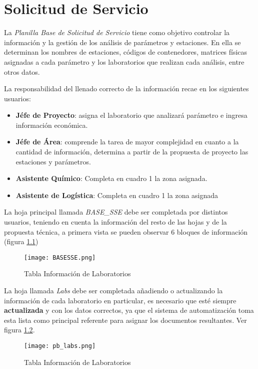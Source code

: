 \chapter{Solicitud de Servicio}

La \textit{Planilla Base de Solicitud de Servicio} tiene como objetivo controlar la información y la gestión de los análisis de parámetros y estaciones. En ella se determinan los nombres de estaciones, códigos de contenedores, matrices físicas asignadas a cada parámetro y los laboratorios que realizan cada análisis, entre otros datos.

La responsabilidad del llenado correcto de la información recae en los siguientes usuarios:

\begin{itemize}
	\item \textbf{Jéfe de Proyecto}: asigna el laboratorio que analizará parámetro e ingresa información económica.
	\item \textbf{Jéfe de Área}: comprende la tarea de mayor complejidad en cuanto a la cantidad de información, determina a partir de la propuesta de proyecto las estaciones y parámetros.
	\item \textbf{Asistente Químico}: Completa en cuadro 1 la zona asignada.
	\item \textbf{Asistente de Logística}: Completa en cuadro 1 la zona asignada
\end{itemize}

La hoja principal llamada \textit{BASE\_SSE} debe ser completada por distintos usuarios, teniendo en cuenta la información del resto de las hojas y de la propuesta técnica, a primera vista se pueden observar 6 bloques de información (figura \ref{basesse})

\begin{landscape}
	\begin{figure}
		\centering
		\texttt{[image: BASESSE.png]}
		\caption{Tabla Información de Laboratorios}
		\label{basesse}
	\end{figure}
\end{landscape}

La hoja llamada \textit{Labs} debe ser completada añadiendo o actualizando la información de cada laboratorio en particular, es necesario que esté siempre \textbf{actualizada} y con los datos correctos, ya que el sistema de automatización toma esta lista como principal referente para asignar los documentos resultantes. Ver figura \ref{pb_labs}.

\begin{landscape}
\begin{figure}
	\centering
	\texttt{[image: pb\_labs.png]}
	\caption{Tabla Información de Laboratorios}
	\label{pb_labs}
\end{figure}
\end{landscape}
	
